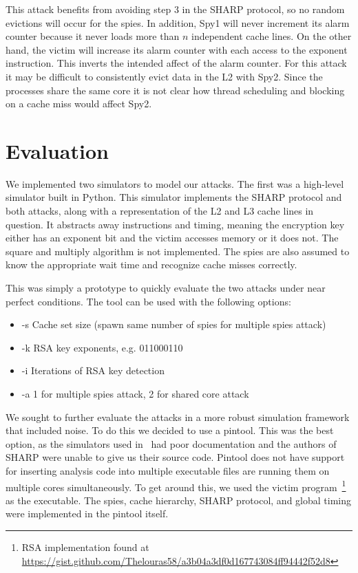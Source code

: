 \documentclass[12pt]{article}
\begin{document}
This attack benefits from avoiding step $3$ in the SHARP protocol, so no random evictions will occur for the spies.
In addition, Spy1 will never increment its alarm counter because it never loads more than $n$ independent cache lines.
On the other hand, the victim will increase its alarm counter with each access to the exponent instruction.
This inverts the intended affect of the alarm counter.
For this attack it may be difficult to consistently evict data in the L2 with Spy2.
Since the processes share the same core it is not clear how thread scheduling and blocking on a cache miss would affect Spy2.

\section{Evaluation}

We implemented two simulators to model our attacks.
The first was a high-level simulator built in Python.
This simulator implements the SHARP protocol and both attacks, along with a representation of the L2 and L3 cache lines in question.
It abstracts away instructions and timing, meaning the encryption key either has an exponent bit and the victim accesses memory or it does not.
The square and multiply algorithm is not implemented.
The spies are also assumed to know the appropriate wait time and recognize cache misses correctly.

This was simply a prototype to quickly evaluate the two attacks under near perfect conditions.
The tool can be used with the following options:

\begin{itemize}
\item -s  Cache set size (spawn same number of spies for multiple spies attack)
\item -k  RSA key exponents, e.g. 011000110
\item -i  Iterations of RSA key detection
\item -a 1 for multiple spies attack, 2 for shared core attack
\end{itemize}

We sought to further evaluate the attacks in a more robust simulation framework that included noise.
To do this we decided to use a pintool.
This was the best option, as the simulators used in~\cite{sharp,howSharp} had poor documentation and the authors of SHARP were unable to give us their source code.
Pintool does not have support for inserting analysis code into multiple executable files are running them on multiple cores simultaneously. 
To get around this, we used the victim program~\footnote{RSA implementation found at \\\url{https://gist.github.com/Thelouras58/a3b04a3df0d167743084ff94442f52d8}} as the executable.
The spies, cache hierarchy, SHARP protocol, and global timing were implemented in the pintool itself.
\end{document}
